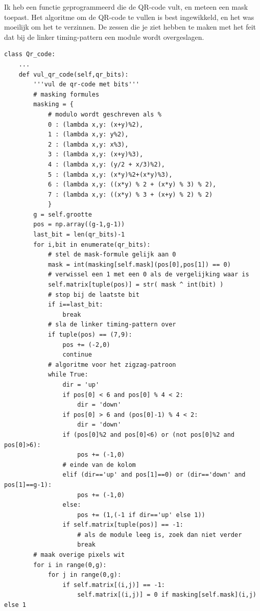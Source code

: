 \documentclass{article}
\begin{document}
Ik heb een functie geprogrammeerd die de QR-code vult, en meteen een mask toepast. Het algoritme om de QR-code te vullen is best ingewikkeld, en het was moeilijk om het te verzinnen. De zessen die je ziet hebben te maken met het feit dat bij de linker timing-pattern een module wordt overgeslagen.
\begin{verbatim}
class Qr_code:
    ...
    def vul_qr_code(self,qr_bits):
        '''vul de qr-code met bits'''
        # masking formules
        masking = {
            # modulo wordt geschreven als %
            0 : (lambda x,y: (x+y)%2),
            1 : (lambda x,y: y%2),
            2 : (lambda x,y: x%3),
            3 : (lambda x,y: (x+y)%3),
            4 : (lambda x,y: (y/2 + x/3)%2),
            5 : (lambda x,y: (x*y)%2+(x*y)%3),
            6 : (lambda x,y: ((x*y) % 2 + (x*y) % 3) % 2),
            7 : (lambda x,y: ((x*y) % 3 + (x+y) % 2) % 2)
            }
        g = self.grootte
        pos = np.array((g-1,g-1))
        last_bit = len(qr_bits)-1
        for i,bit in enumerate(qr_bits):
            # stel de mask-formule gelijk aan 0
            mask = int(masking[self.mask](pos[0],pos[1]) == 0)
            # verwissel een 1 met een 0 als de vergelijking waar is
            self.matrix[tuple(pos)] = str( mask ^ int(bit) )
            # stop bij de laatste bit
            if i==last_bit:
                break
            # sla de linker timing-pattern over
            if tuple(pos) == (7,9):
                pos += (-2,0)
                continue
            # algoritme voor het zigzag-patroon
            while True:
                dir = 'up'
                if pos[0] < 6 and pos[0] % 4 < 2:
                    dir = 'down'
                if pos[0] > 6 and (pos[0]-1) % 4 < 2:
                    dir = 'down'
                if (pos[0]%2 and pos[0]<6) or (not pos[0]%2 and pos[0]>6):
                    pos += (-1,0)
                # einde van de kolom
                elif (dir=='up' and pos[1]==0) or (dir=='down' and pos[1]==g-1):
                    pos += (-1,0)
                else:
                    pos += (1,(-1 if dir=='up' else 1))
                if self.matrix[tuple(pos)] == -1:
                    # als de module leeg is, zoek dan niet verder
                    break
        # maak overige pixels wit
        for i in range(0,g):
            for j in range(0,g):
                if self.matrix[(i,j)] == -1:
                    self.matrix[(i,j)] = 0 if masking[self.mask](i,j) else 1
\end{verbatim}
\end{document}

